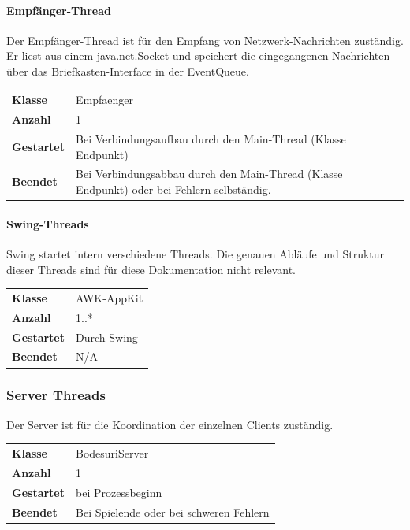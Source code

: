 \documentclass[12pt,halfparskip]{scrartcl}
\begin{document}
\paragraph{Empfänger-Thread}

Der Empfänger-Thread ist für den Empfang von Netzwerk-Nachrichten zuständig. Er liest aus einem java.net.Socket und speichert die eingegangenen Nachrichten über das Briefkasten-Interface in der EventQueue.

\begin{tabular}{@{} l p{12.5cm}}
\textbf{Klasse}       & Empfaenger \\
\textbf{Anzahl}       & 1 \\
\textbf{Gestartet}    & Bei Verbindungsaufbau durch den Main-Thread (Klasse Endpunkt) \\
\textbf{Beendet}      & Bei Verbindungsabbau durch den Main-Thread (Klasse Endpunkt) oder bei Fehlern selbständig.
\end{tabular}


\paragraph{Swing-Threads}
\label{ssub:swing_threads}

Swing startet intern verschiedene Threads. Die genauen Abläufe und Struktur dieser Threads sind für diese Dokumentation nicht relevant.

\begin{tabular}{@{} l p{12.5cm}}
\textbf{Klasse}       & AWK-AppKit \\
\textbf{Anzahl}       & 1..* \\
\textbf{Gestartet}    & Durch Swing \\
\textbf{Beendet}      & N/A

\end{tabular}

\clearpage
\subsubsection{Server Threads}
\label{ssub:server}

Der Server ist für die Koordination der einzelnen Clients zuständig.

\begin{tabular}{@{} l p{12.5cm}}
\textbf{Klasse}       & BodesuriServer \\
\textbf{Anzahl}       & 1 \\
\textbf{Gestartet}    & bei Prozessbeginn \\
\textbf{Beendet}      & Bei Spielende oder bei schweren Fehlern
\end{tabular}
\end{document}
